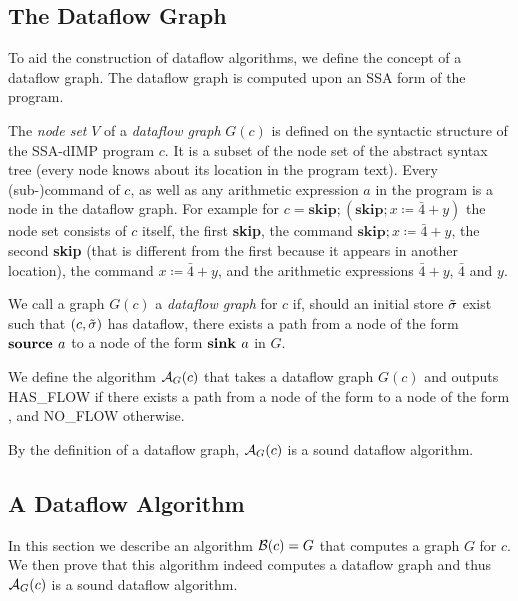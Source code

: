 \subsection{The Dataflow Graph}
To aid the construction of dataflow algorithms, we define the concept
of a dataflow graph.
The dataflow graph is computed upon an SSA form of the program.

\begin{definition}
    The \emph{node set} $V$ of a \emph{dataflow graph} $G(c)$
    is defined on the syntactic structure
    of the SSA-dIMP program $c$. It is a subset of the node set of the abstract syntax tree
    (every node knows about its location in the program text).
    Every (sub-)command of $c$, as well as any arithmetic expression $a$ in the 
    program is a node in the dataflow graph.
    For example for
    $c = \textbf{skip}; (\textbf{skip}; x \coloneqq \bar{4} + y)$
    the node set consists of $c$ itself, the first \textbf{skip}, the command 
    $\textbf{skip}; x \coloneqq \bar{4} + y$, the second \textbf{skip} (that is different 
    from the first because it appears in another location), the command
    $x \coloneqq \bar{4} + y$, and the arithmetic expressions $\bar{4}+y$,
    $\bar{4}$ and $y$.

    We call a graph $G(c)$ a \emph{dataflow graph} for $c$ if, should an initial store
    $\tilde{\sigma}{}$ exist such that $(c, \tilde{\sigma}{})$ has dataflow,
    there exists a path from a node of the form $\textbf{source }{a}$ to a node of 
    the form $\textbf{sink }{a}$ in $G$.
\end{definition}

\begin{definition}
    We define the algorithm $\operatorname{\mathcal{A}}_{G}(c)$ that takes a dataflow graph $G(c)$
    and outputs HAS\_FLOW if there exists a path from a node of the form 
    to a node of the form , and NO\_FLOW otherwise.
\end{definition}
\begin{remark}
    By the definition of a dataflow graph, $\operatorname{\mathcal{A}}_G(c)$ is a sound dataflow algorithm.
\end{remark}

\subsection{A Dataflow Algorithm}
In this section we describe an algorithm $\operatorname{\mathcal{B}}(c) = G$ that computes a 
graph $G$ for $c$. We then prove that this algorithm indeed
computes a dataflow graph and thus $\operatorname{\mathcal{A}}_G(c)$ is a sound dataflow algorithm.

